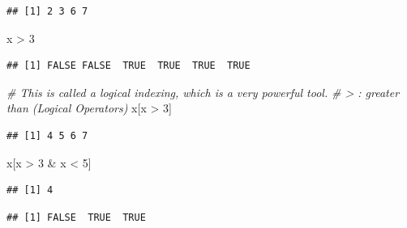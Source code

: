 \documentclass[]{book}
\newenvironment{Shaded}{\begin{snugshade}}{\end{snugshade}}
\newcommand{\KeywordTok}[1]{\textcolor[rgb]{0.13,0.29,0.53}{\textbf{{#1}}}}
\newcommand{\DecValTok}[1]{\textcolor[rgb]{0.00,0.00,0.81}{{#1}}}
\newcommand{\StringTok}[1]{\textcolor[rgb]{0.31,0.60,0.02}{{#1}}}
\newcommand{\CommentTok}[1]{\textcolor[rgb]{0.56,0.35,0.01}{\textit{{#1}}}}
\newcommand{\NormalTok}[1]{{#1}}
\begin{document}
\begin{verbatim}
## [1] 2 3 6 7
\end{verbatim}

\begin{Shaded}
\begin{Highlighting}[]
\NormalTok{x >}\StringTok{ }\DecValTok{3}
\end{Highlighting}
\end{Shaded}

\begin{verbatim}
## [1] FALSE FALSE  TRUE  TRUE  TRUE  TRUE
\end{verbatim}

\begin{Shaded}
\begin{Highlighting}[]
\CommentTok{# This is called a logical indexing, which is a very powerful tool.}
\CommentTok{# > : greater than (Logical Operators)}
\NormalTok{x[x >}\StringTok{ }\DecValTok{3}\NormalTok{]   }
\end{Highlighting}
\end{Shaded}

\begin{verbatim}
## [1] 4 5 6 7
\end{verbatim}

\begin{Shaded}
\begin{Highlighting}[]
\NormalTok{x[x >}\StringTok{ }\DecValTok{3} \NormalTok{&}\StringTok{ }\NormalTok{x <}\StringTok{ }\DecValTok{5}\NormalTok{]}
\end{Highlighting}
\end{Shaded}

\begin{verbatim}
## [1] 4
\end{verbatim}

\begin{Shaded}
\end{Shaded}

\begin{verbatim}
## [1] FALSE  TRUE  TRUE
\end{verbatim}
\end{document}
